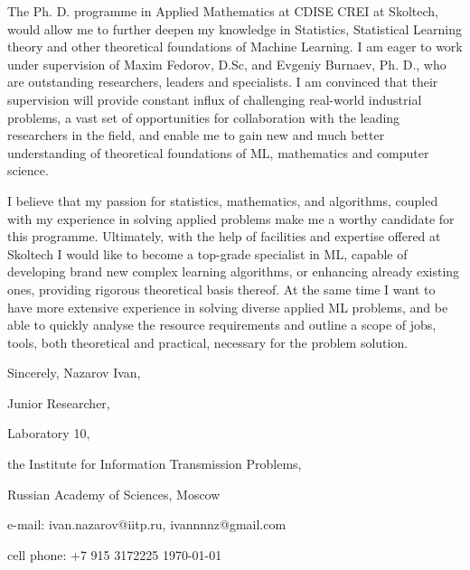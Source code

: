 \documentclass[14pt]{letter}
\begin{document}
The Ph. D. programme in Applied Mathematics at CDISE CREI at Skoltech, would allow me to further deepen my knowledge in Statistics, Statistical Learning theory and other theoretical foundations of Machine Learning. I am eager to work under supervision of Maxim Fedorov, D.Sc, and Evgeniy Burnaev, Ph. D., who are outstanding researchers, leaders and specialists. I am convinced that their supervision will provide constant influx of challenging real-world industrial problems, a vast set of opportunities for collaboration with the leading researchers in the field, and enable me to gain new and much better understanding of theoretical foundations of ML, mathematics and computer science. \par\medskip

I believe that my passion for statistics, mathematics, and algorithms, coupled with my experience in solving applied problems make me a worthy candidate for this programme. Ultimately, with the help of facilities and expertise offered at Skoltech I would like to become a top-grade specialist in ML, capable of developing brand new complex learning algorithms, or enhancing already existing ones, providing rigorous theoretical basis thereof. At the same time I want to have more extensive experience in solving diverse applied ML problems, and be able to quickly analyse the resource requirements and outline a scope of jobs, tools, both theoretical and practical, necessary for the problem solution. \par\medskip

Sincerely,
Nazarov Ivan, \par
Junior Researcher, \par
Laboratory 10, \par
the Institute for Information Transmission Problems, \par
Russian Academy of Sciences, Moscow \par

e-mail: ivan.nazarov@iitp.ru, ivannnnz@gmail.com \par
cell phone: +7 915 3172225
\hfill\today
\hfill\par
\end{document}
